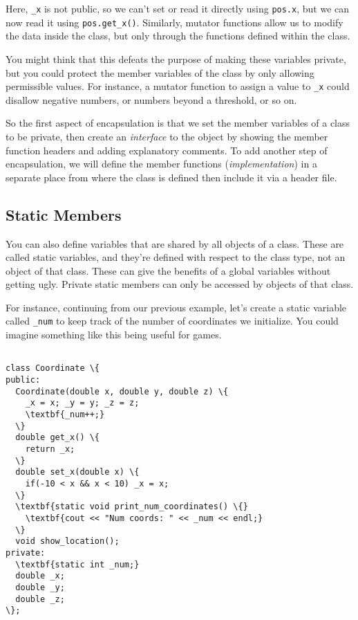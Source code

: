 \documentclass{IEEEtran}
\begin{document}
Here, \verb|_x| is not public, so we can't set or read it directly using \verb|pos.x|, but we can now read it using \verb|pos.get_x()|. Similarly, mutator functions allow us to modify the data inside the class, but only through the functions defined within the class.

You might think that this defeats the purpose of making these variables private, but you could protect the member variables of the class by only allowing permissible values. For instance, a mutator function to assign a value to \verb|_x| could disallow negative numbers, or numbers beyond a threshold, or so on. 

So the first aspect of encapsulation is that we set the member variables of a class to be private, then create an \textit{interface} to the object by showing the member function headers and adding explanatory comments. To add another step of encapsulation, we will define the member functions (\textit{implementation}) in a separate place from where the class is defined then include it via a header file.



\subsection{Static Members}

You can also define variables that are shared by all objects of a class. These are called static variables, and they're defined with respect to the class type, not an object of that class. These can give the benefits of a global variables without getting ugly. Private static members can only be accessed by objects of that class.

For instance, continuing from our previous example, let's create a static variable called \verb|_num| to keep track of the number of coordinates we initialize. You could imagine something like this being useful for games.

\begin{Verbatim}[fontsize=\scriptsize, xleftmargin=.3in, commandchars=\\\{\}]

class Coordinate \{
public:
  Coordinate(double x, double y, double z) \{ 
    _x = x; _y = y; _z = z;
    \textbf{_num++;}
  \}
  double get_x() \{
    return _x;
  \}
  double set_x(double x) \{
    if(-10 < x && x < 10) _x = x;
  \}
  \textbf{static void print_num_coordinates() \{}
    \textbf{cout << "Num coords: " << _num << endl;}
  \}
  void show_location();
private:
  \textbf{static int _num;}
  double _x;
  double _y;
  double _z;
\};

\end{Verbatim}
\end{document}
